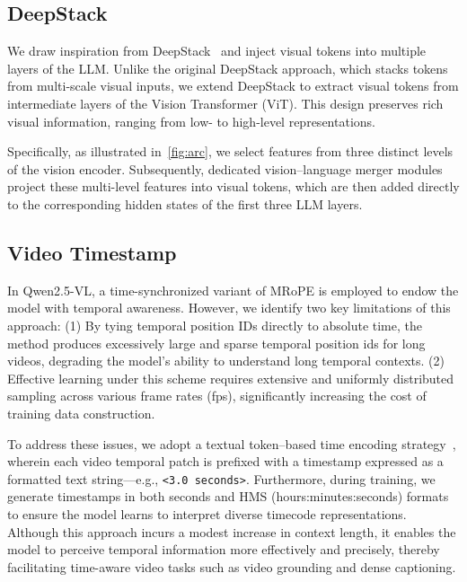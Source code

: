 \documentclass{article} %
\begin{document}
\subsection{DeepStack}
\label{sec:deepstack}
We draw inspiration from DeepStack~\citep{meng2024deepstack} and inject visual tokens into multiple layers of the LLM. Unlike the original DeepStack approach, which stacks tokens from multi-scale visual inputs, we extend DeepStack to extract visual tokens from intermediate layers of the Vision Transformer (ViT). This design preserves rich visual information, ranging from low- to high-level representations.

Specifically, as illustrated in~\cref{fig:arc}, we select features from three distinct levels of the vision encoder. Subsequently, dedicated vision–language merger modules project these multi-level features into visual tokens, which are then added directly to the corresponding hidden states of the first three LLM layers.

\subsection{Video Timestamp}
In Qwen2.5-VL, a time-synchronized variant of MRoPE is employed to endow the model with temporal awareness. However, we identify two key limitations of this approach:
(1) By tying temporal position IDs directly to absolute time, the method produces excessively large and sparse temporal position ids for long videos, degrading the model’s ability to understand long temporal contexts.
(2) Effective learning under this scheme requires extensive and uniformly distributed sampling across various frame rates (fps), significantly increasing the cost of training data construction.

To address these issues, we adopt a textual token–based time encoding strategy~\citep{chen2024timemarker}, wherein each video temporal patch is prefixed with a timestamp expressed as a formatted text string—e.g., \texttt{<3.0 seconds>}.
Furthermore, during training, we generate timestamps in both seconds and HMS (hours:minutes:seconds) formats to ensure the model learns to interpret diverse timecode representations. Although this approach incurs a modest increase in context length, it enables the model to perceive temporal information more effectively and precisely, thereby facilitating time-aware video tasks such as video grounding and dense captioning.
\end{document}
